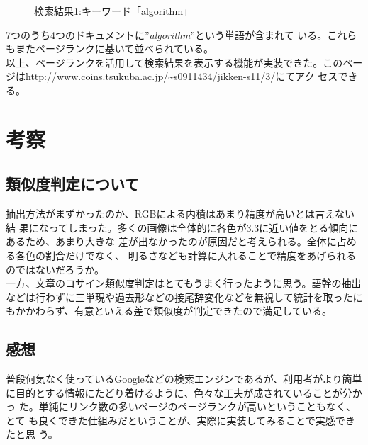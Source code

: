 \documentclass[a4paper,9pt]{jsarticle}
\begin{document}
\begin{figure}[H]
 \caption{検索結果1:キーワード「algorithm」}
 \begin{center}
 \end{center}
\end{figure}

7つのうち4つのドキュメントに''{\itshape algorithm}''という単語が含まれて
いる。これらもまたページランクに基いて並べられている。\\

以上、ページランクを活用して検索結果を表示する機能が実装できた。このペー
ジは\url{http://www.coins.tsukuba.ac.jp/~s0911434/jikken-s11/3/}にてアク
セスできる。
\newpage

\section{考察}
\subsection{類似度判定について}
抽出方法がまずかったのか、RGBによる内積はあまり精度が高いとは言えない結
果になってしまった。多くの画像は全体的に各色が3.3に近い値をとる傾向にあるため、あまり大きな
差が出なかったのが原因だと考えられる。全体に占める各色の割合だけでなく、
明るさなども計算に入れることで精度をあげられるのではないだろうか。\\
一方、文章のコサイン類似度判定はとてもうまく行ったように思う。語幹の抽出
などは行わずに三単現や過去形などの接尾辞変化などを無視して統計を取ったに
もかかわらず、有意といえる差で類似度が判定できたので満足している。

\subsection{感想}
普段何気なく使っているGoogleなどの検索エンジンであるが、利用者がより簡単
に目的とする情報にたどり着けるように、色々な工夫が成されていることが分かっ
た。単純にリンク数の多いページのページランクが高いということもなく、とて
も良くできた仕組みだということが、実際に実装してみることで実感できたと思
う。
\end{document}
